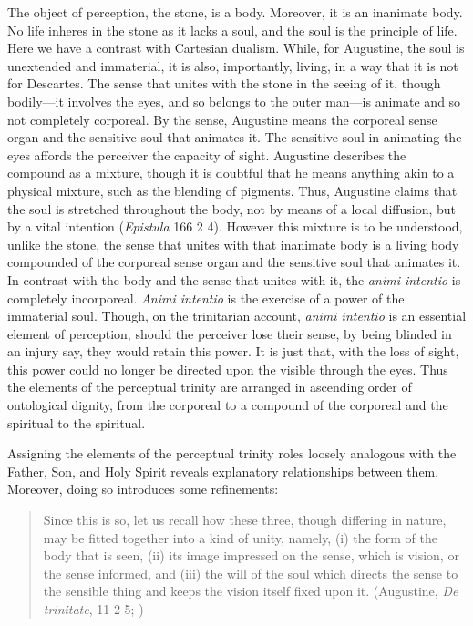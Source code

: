 \documentclass[12pt]{article}
\begin{document}
The object of perception, the stone, is a body. Moreover, it is an inanimate body. No life inheres in the stone as it lacks a soul, and the soul is the principle of life. Here we have a contrast with Cartesian dualism. While, for Augustine, the soul is unextended and immaterial, it is also, importantly, living, in a way that it is not for Descartes. The sense that unites with the stone in the seeing of it, though bodily---it involves the eyes, and so belongs to the outer man---is animate and so not completely corporeal. By the sense, Augustine means the corporeal sense organ and the sensitive soul that animates it. The sensitive soul in animating the eyes affords the perceiver the capacity of sight. Augustine describes the compound as a mixture, though it is doubtful that he means anything akin to a physical mixture, such as the blending of pigments. Thus, Augustine claims that the soul is stretched throughout the body, not by means of a local diffusion, but by a vital intention (\emph{Epistula} 166 2 4). However this mixture is to be understood, unlike the stone, the sense that unites with that inanimate body is a living body compounded of the corporeal sense organ and the sensitive soul that animates it. In contrast with the body and the sense that unites with it, the \emph{animi intentio} is completely incorporeal. \emph{Animi intentio} is the exercise of a power of the immaterial soul. Though, on the trinitarian account, \emph{animi intentio} is an essential element of perception, should the perceiver lose their sense, by being blinded in an injury say, they would retain this power. It is just that, with the loss of sight, this power could no longer be directed upon the visible through the eyes. Thus the elements of the perceptual trinity are arranged in ascending order of ontological dignity, from the corporeal to a compound of the corporeal and the spiritual to the spiritual.

Assigning the elements of the perceptual trinity roles loosely analogous with the Father, Son, and Holy Spirit reveals explanatory relationships between them. Moreover, doing so introduces some refinements:
\begin{quote}
	Since this is so, let us recall how these three, though differing in nature, may be fitted together into a kind of unity, namely, (i) the form of the body that is seen, (ii) its image impressed on the sense, which is vision, or the sense informed, and (iii) the will of the soul which directs the sense to the sensible thing and keeps the vision itself fixed upon it. (Augustine, \emph{De trinitate}, 11 2 5; \citealt[65]{Matthews:2002ly})
\end{quote}
\end{document}
